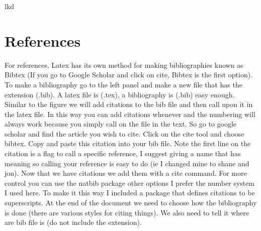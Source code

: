 \documentclass{article}
\begin{document}
lkd 
\section{References}
For references, Latex has its own method for making bibliographies known as Bibtex (If you go to Google Scholar and click on cite, Bibtex is the first option). 
To make a bibliography go to the left panel and make a new file that has the extension (.bib).
A latex file is (.tex), a bibliography is (.bib) easy enough.
Similar to the figure we will add citations to the bib file and then call upon it in the latex file.
In this way you can add citations whenever and the numbering will always work because you simply call on the file in the text.
So go to google scholar and find the article you wish to cite.
Click on the cite tool and choose bibtex.
Copy and paste this citation into your bib file.
Note the first line on the citation is a flag to call a specific reference, I suggest giving a name that has meaning so calling your reference is easy to do (ie I changed mine to shane and jon).
Now that we have citations we add them with a cite command.
For more control you can use the natbib package other options I prefer the number system I used here\cite{shane}.
To make it this way I included a package that defines citations to be superscripts.
At the end of the document we need to choose how the bibliography is done (there are various styles for citing things)\cite{jon}.
We also need to tell it where are bib file is (do not include the extension). 



\end{document}
